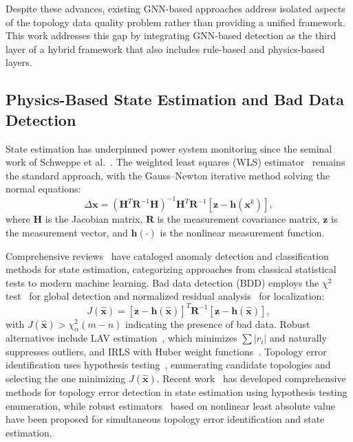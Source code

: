 \documentclass[research]{fcs}
\begin{document}
Despite these advances, existing GNN-based approaches address isolated aspects of the topology data quality problem rather than providing a unified framework. This work addresses this gap by integrating GNN-based detection as the third layer of a hybrid framework that also includes rule-based and physics-based layers.

\subsection{Physics-Based State Estimation and Bad Data Detection}

State estimation has underpinned power system monitoring since the seminal work of Schweppe et al.~\cite{wls1970state}. The weighted least squares (WLS) estimator~\cite{wls_gauss_newton} remains the standard approach, with the Gauss--Newton iterative method solving the normal equations:
\begin{equation}
\Delta \mathbf{x} = (\mathbf{H}^T \mathbf{R}^{-1} \mathbf{H})^{-1} \mathbf{H}^T \mathbf{R}^{-1} [\mathbf{z} - \mathbf{h}(\mathbf{x}^k)],
\end{equation}
where $\mathbf{H}$ is the Jacobian matrix, $\mathbf{R}$ is the measurement covariance matrix, $\mathbf{z}$ is the measurement vector, and $\mathbf{h}(\cdot)$ is the nonlinear measurement function.

Comprehensive reviews~\cite{asefi_anomaly_se2023} have cataloged anomaly detection and classification methods for state estimation, categorizing approaches from classical statistical tests to modern machine learning. Bad data detection (BDD) employs the $\chi^2$ test~\cite{chi2_test_se} for global detection and normalized residual analysis~\cite{normalized_residual} for localization:
\begin{equation}
J(\hat{\mathbf{x}}) = [\mathbf{z} - \mathbf{h}(\hat{\mathbf{x}})]^T \mathbf{R}^{-1} [\mathbf{z} - \mathbf{h}(\hat{\mathbf{x}})],
\end{equation}
with $J(\hat{\mathbf{x}}) > \chi^2_\alpha(m-n)$ indicating the presence of bad data. Robust alternatives include LAV estimation~\cite{lav1991state}, which minimizes $\sum |r_i|$ and naturally suppresses outliers, and IRLS with Huber weight functions~\cite{huber1964robust}. Topology error identification uses hypothesis testing~\cite{chi2_test_se}, enumerating candidate topologies and selecting the one minimizing $J(\hat{\mathbf{x}})$. Recent work~\cite{topo_error_neu2021} has developed comprehensive methods for topology error detection in state estimation using hypothesis testing enumeration, while robust estimators~\cite{nlav_topo2021} based on nonlinear least absolute value have been proposed for simultaneous topology error identification and state estimation.
\end{document}

